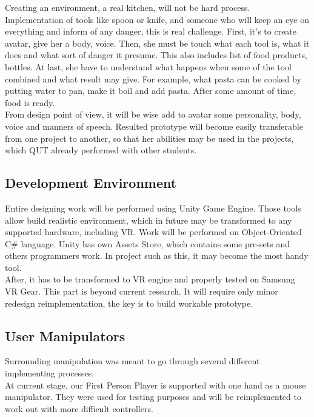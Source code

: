 \documentclass[18pt]{article}
\numberwithin{equation}{section} %
\numberwithin{figure}{section} %
\numberwithin{table}{section} %
\begin{document}
	Creating an environment, a real kitchen, will not be hard process. Implementation of tools like spoon or knife, and someone who will keep an eye on everything and inform of any danger, this is real challenge. First, it's to create avatar, give her a body, voice. Then, she must be touch what each tool is, what it does and what sort of danger it presume. This also includes list of food products, bottles. At last, she have to understand what happens when some of the tool combined and what result may give. For example, what pasta can be cooked by putting water to pan, make it boil and add pasta. After some amount of time, food is ready. \\
	
	From design point of view, it will be wise add to avatar some personality, body, voice and manners of speech. Resulted prototype will become easily transferable from one project to another, so that her abilities may be used in the projects, which QUT already performed with other students. \\
	
	\subsection{Development Environment}
		Entire designing work will be performed using Unity Game Engine. Those tools allow build realistic environment, which in future may be transformed to any supported hardware, including VR. Work will be performed on Object-Oriented C\# language. Unity has own Assets Store, which contains some pre-sets and others programmers work. In project such as this, it may become the most handy tool. \\
		
		After, it has to be transformed to VR engine and properly tested on Samsung VR Gear. This part is beyond current research. It will require only minor redesign reimplementation, the key is to build workable prototype. \\
	
	\subsection{User Manipulators}
		Surrounding manipulation was meant to go through several different implementing processes.\\	
		At current stage, our First Person Player is supported with one hand as a mouse manipulator. They were used for testing purposes and will be reimplemented to work out with more difficult controllers. \\
		
\end{document}
